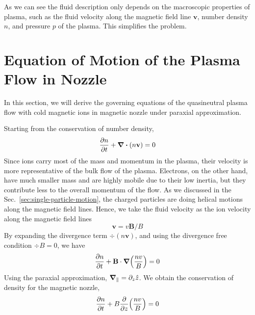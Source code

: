 As we can see the fluid description only depends on the macroscopic properties of plasma, such as the fluid velocity along the magnetic field line $\mathbf{v}$, number density $n$, and pressure $p$ of the plasma. This simplifies the problem.

\section{Equation of Motion of the Plasma Flow in Nozzle} \label{sec:equation-of-motion-of-the-plasma-flow-in-nozzle}
In this section, we will derive the governing equations of the quasineutral plasma flow with cold magnetic ions in magnetic nozzle under paraxial approximation.

Starting from the conservation of number density,
\begin{equation}
	\pdv{n}{t} + \div(n\mathbf{v}) = 0
\end{equation}
Since ions carry most of the mass and momentum in the plasma, their velocity is more representative of the bulk flow of the plasma. Electrons, on the other hand, have much smaller mass and are highly mobile due to their low inertia, but they contribute less to the overall momentum of the flow. As we discussed in the Sec.~\ref{sec:single-particle-motion}, the charged particles are doing helical motions along the magnetic field lines. Hence, we take the fluid velocity as the ion velocity along the magnetic field lines
\begin{equation}
	\mathbf{v} = v\mathbf{B}/B
\end{equation}
By expanding the divergence term $\div(n\mathbf{v})$, and using the divergence free condition $\div B=0$, we have
\begin{equation}
	\pdv{n}{t} + \mathbf{B}\cdot \grad(\frac{nv}{B}) = 0
\end{equation}
Using the paraxial approximation, $\grad_\parallel = \partial_z\hat{z}$. We obtain the conservation of density for the magnetic nozzle,
\begin{equation}
	\pdv{n}{t} + B\pdv{z}(\frac{nv}{B}) = 0
\end{equation}

